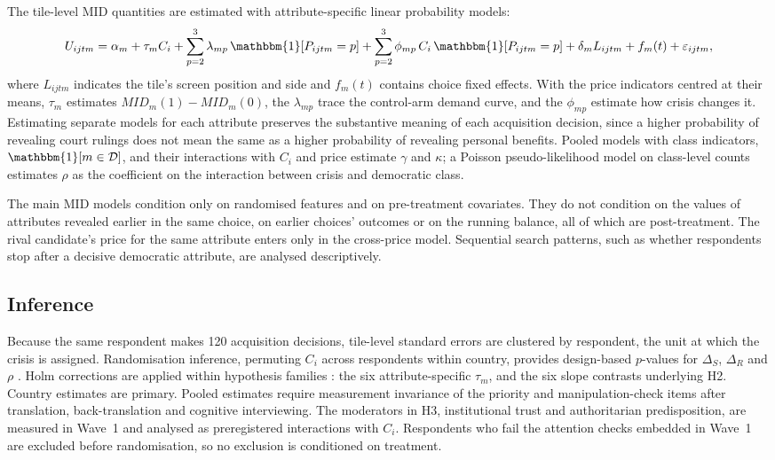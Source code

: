 \documentclass[11pt]{article}
\newcommand{\MID}{\mathit{MID}}
\newcommand{\Dem}{\mathcal{D}}
\begin{document}
The tile-level MID quantities are estimated with attribute-specific linear probability models:
\[
U_{ijtm}=\alpha_m+\tau_m C_i+\sum_{p=2}^{3}\lambda_{mp}\,\mathbbm{1}[P_{ijtm}=p]+\sum_{p=2}^{3}\phi_{mp}\,C_i\,\mathbbm{1}[P_{ijtm}=p]+\delta_m L_{ijtm}+f_m(t)+\varepsilon_{ijtm},
\]
where $L_{ijtm}$ indicates the tile's screen position and side and $f_m(t)$ contains choice fixed effects. With the price indicators centred at their means, $\tau_m$ estimates $\MID_m(1)-\MID_m(0)$, the $\lambda_{mp}$ trace the control-arm demand curve, and the $\phi_{mp}$ estimate how crisis changes it. Estimating separate models for each attribute preserves the substantive meaning of each acquisition decision, since a higher probability of revealing court rulings does not mean the same as a higher probability of revealing personal benefits. Pooled models with class indicators, $\mathbbm{1}[m\in\Dem]$, and their interactions with $C_i$ and price estimate $\gamma$ and $\kappa$; a Poisson pseudo-likelihood model on class-level counts estimates $\rho$ as the coefficient on the interaction between crisis and democratic class.

The main MID models condition only on randomised features and on pre-treatment covariates. They do not condition on the values of attributes revealed earlier in the same choice, on earlier choices' outcomes or on the running balance, all of which are post-treatment. The rival candidate's price for the same attribute enters only in the cross-price model. Sequential search patterns, such as whether respondents stop after a decisive democratic attribute, are analysed descriptively.

\subsection{Inference}

Because the same respondent makes 120 acquisition decisions, tile-level standard errors are clustered by respondent, the unit at which the crisis is assigned. Randomisation inference, permuting $C_i$ across respondents within country, provides design-based $p$-values for $\Delta_S$, $\Delta_R$ and $\rho$ \parencite{GerberGreen2012,ImbensRubin2015}. Holm corrections are applied within hypothesis families \parencite{Holm1979}: the six attribute-specific $\tau_m$, and the six slope contrasts underlying H2. Country estimates are primary. Pooled estimates require measurement invariance of the priority and manipulation-check items after translation, back-translation and cognitive interviewing. The moderators in H3, institutional trust and authoritarian predisposition, are measured in Wave~1 and analysed as preregistered interactions with $C_i$. Respondents who fail the attention checks embedded in Wave~1 are excluded before randomisation, so no exclusion is conditioned on treatment.
\end{document}
